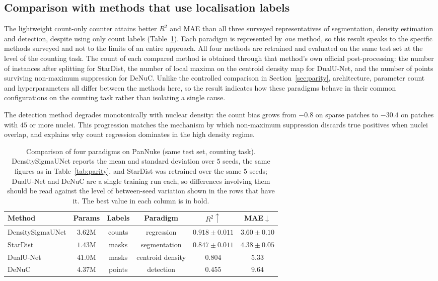 \documentclass[preprint,12pt]{elsarticle}
\begin{document}
\subsection{Comparison with methods that use localisation labels}\label{sec:paradigm}

The lightweight count-only counter attains better $R^2$ and MAE than all three surveyed representatives of
segmentation, density estimation and detection, despite using only count labels (Table~\ref{tab:paradigm}).
Each paradigm is represented by \emph{one} method, so this result speaks to the specific methods surveyed and
not to the limits of an entire approach. All four methods are retrained and evaluated on the same test set at
the level of the counting task. The count of each compared method is obtained through that method's own
official post-processing: the number of instances after splitting for StarDist, the number of local maxima on
the centroid density map for DualU-Net, and the number of points surviving non-maximum suppression for DeNuC.
Unlike the controlled comparison in Section~\ref{sec:parity}, architecture, parameter count and
hyperparameters all differ between the methods here, so the result indicates how these paradigms behave in
their common configurations on the counting task rather than isolating a single cause.

The detection method degrades monotonically with nuclear density: the count bias grows from $-0.8$ on sparse
patches to $-30.4$ on patches with $45$ or more nuclei. This progression matches the mechanism by which
non-maximum suppression discards true positives when nuclei overlap, and explains why count regression
dominates in the high density regime.

\begin{table}[!htbp]
\centering
\caption{Comparison of four paradigms on PanNuke (same test set, counting task). DensitySigmaUNet reports the
mean and standard deviation over $5$ seeds, the same figures as in Table~\ref{tab:parity}, and StarDist was
retrained over the same $5$ seeds; DualU-Net and DeNuC are a single training run each, so differences
involving them should be read against the level of between-seed variation shown in the rows that have it. The best value in each column is in bold.}\label{tab:paradigm}
\small
\begin{tabular}{@{}lccccc@{}}
\toprule
Method & Params & Labels & Paradigm & $R^2\uparrow$ & MAE$\downarrow$ \\
\midrule
DensitySigmaUNet & $3.62$M & counts & regression & $\mathbf{0.918\pm0.011}$ & $\mathbf{3.60\pm0.10}$ \\
StarDist~\cite{stardist} & $1.43$M & masks & segmentation & $0.847\pm0.011$ & $4.38\pm0.05$ \\
DualU-Net~\cite{dualunet} & $41.0$M & masks & centroid density & $0.804$ & $5.33$ \\
DeNuC~\cite{denuc} & $4.37$M & points & detection & $0.455$ & $9.64$ \\
\bottomrule
\end{tabular}
\end{table}
\end{document}
